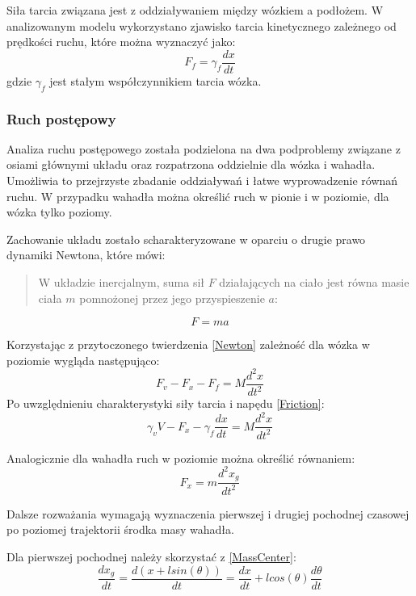 \documentclass[12pt, oneside]{report}
\theoremstyle{definition}
\begin{document}
Siła tarcia związana jest z oddziaływaniem między wózkiem a podłożem. W analizowanym modelu wykorzystano zjawisko tarcia kinetycznego zależnego od prędkości ruchu, które można wyznaczyć jako:
\begin{equation} \label{Friction}
F_f = \gamma_f \frac{dx}{dt}
\end{equation}
gdzie $\gamma_f$ jest stałym współczynnikiem tarcia wózka.

\subsubsection{Ruch postępowy}
Analiza ruchu postępowego została podzielona na dwa podproblemy związane z osiami głównymi układu oraz rozpatrzona oddzielnie dla wózka i wahadła. Umożliwia to przejrzyste zbadanie oddziaływań i łatwe wyprowadzenie równań ruchu. W przypadku wahadła można określić ruch w pionie i w poziomie, dla wózka tylko poziomy. 

Zachowanie układu zostało scharakteryzowane w oparciu o drugie prawo dynamiki Newtona, które mówi:
\begin{quote}
W układzie inercjalnym, suma sił $F$ działających na ciało jest równa masie ciała $m$ pomnożonej przez jego przyspieszenie $a$:
\end{quote}
\begin{equation} \label{Newton}
F = ma
\end{equation}

Korzystając z przytoczonego twierdzenia \ref{Newton} zależność dla wózka w poziomie wygląda następująco:
\begin{equation}
F_v - F_x - F_f = M \frac{d^2x}{dt^2}
\end{equation}
Po uwzględnieniu charakterystyki siły tarcia i napędu \ref{Friction}:
\begin{equation} \label{CartX}
\gamma_v V - F_x - \gamma_f \frac{dx}{dt} = M \frac{d^2x}{dt^2}
\end{equation}

Analogicznie dla wahadła ruch w poziomie można określić równaniem:
\begin{equation} \label{PendulumX}
F_x = m \frac{d^2x_g}{dt^2}
\end{equation}

Dalsze rozważania wymagają wyznaczenia pierwszej i drugiej pochodnej czasowej po poziomej trajektorii środka masy wahadła.

Dla pierwszej pochodnej należy skorzystać z \ref{MassCenter}:
\begin{equation} \label{FirstDerivative}
\frac{dx_g}{dt} = \frac{d(x + lsin(\theta))}{dt} = \frac{dx}{dt} + lcos(\theta)\frac{d\theta}{dt}
\end{equation}
\end{document}
